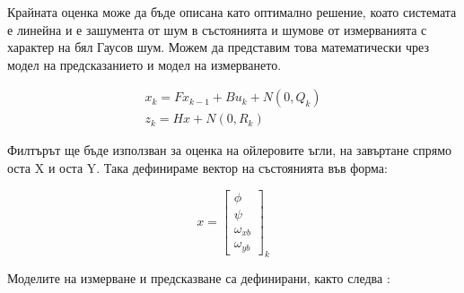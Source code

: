 Крайната оценка може да бъде описана като оптимално решение,
коато системата е линейна и е зашумента от шум в състоянията и шумове от измерванията с характер на бял Гаусов шум.
Можем да представим това математически чрез модел на предсказанието 
и модел на измерването.

\begin{align}
    x_k = F x_{k-1} + B u_k + N(0, Q_k) \\
    z_k = H x + N(0, R_k)
\end{align}

Филтърът ще бъде използван за оценка на ойлеровите ъгли, на завъртане спрямо оста X и оста Y.
Така дефинираме вектор на състоянията във форма:

\begin{equation*}
    x = 
    \begin{bmatrix}
        \phi\\
        \psi\\
        \omega_{xb}\\
        \omega_{yb}
    \end{bmatrix}_k
\end{equation*}

Моделите на измерване и предсказване са дефинирани, както следва \cite{watson2013design}:

